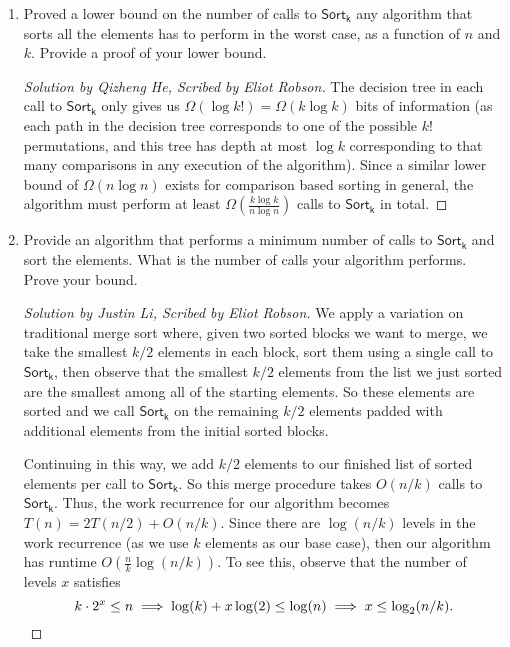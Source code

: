\documentclass{article}
\newenvironment{scribed}[2]{\begin{proof}[Solution by #1, Scribed by #2]}{\end{proof}}
\newcommand{\Sortk}{\mathsf{Sort_k}}
\begin{document}
\begin{enumerate}
	\item Proved a lower bound on the number of calls to \(\Sortk\) any algorithm that sorts all the elements has to perform in the worst case, as a function of \(n\) and \(k\). Provide a proof of your lower bound. 
	
	\begin{scribed}{Qizheng He}{Eliot Robson}
		The decision tree in each call to \(\Sortk\) only gives us \(\Omega(\log k!) = \Omega(k \log k)\) bits of information (as each path in the decision tree corresponds to one of the possible \(k!\) permutations, and this tree has depth at most \(\log k\) corresponding to that many comparisons in any execution of the algorithm). Since a similar lower bound of \(\Omega(n \log n)\) exists for comparison based sorting in general, the algorithm must perform at least \(\Omega(\frac{k \log k}{n \log n})\) calls to \(\Sortk\) in total.
	\end{scribed}
	
	\item Provide an algorithm that performs a minimum number of calls to \(\Sortk\) and sort the elements. What is the number of calls your algorithm performs. Prove your bound.
	
	\begin{scribed}{Justin Li}{Eliot Robson}
		We apply a variation on traditional merge sort where, given two sorted blocks we want to merge, we take the smallest \(k/2\) elements in each block, sort them using a single call to \(\Sortk\), then observe that the smallest \(k/2\) elements from the list we just sorted are the smallest among all of the starting elements. So these elements are sorted and we call \(\Sortk\) on the remaining \(k/2\) elements padded with additional elements from the initial sorted blocks.
        
        Continuing in this way, we add \(k/2\) elements to our finished list of sorted elements per call to \(\Sortk\). So this merge procedure takes \(O(n/k)\) calls to \(\Sortk\). Thus, the work recurrence for our algorithm becomes \(T(n) = 2 T(n/2) + O(n/k)\). Since there are \(\log (n/k)\) levels in the work recurrence (as we use \(k\) elements as our base case), then our algorithm has runtime \(O(\frac{n}{k} \log (n/k))\). To see this, observe that the number of levels \(x\) satisfies
        \[
            k \cdot 2^x \leq n
            \implies
            \log(k) + x \log(2) \leq \log(n)
            \implies
            x \leq \log_2 (n/k). \qedhere
        \]
	\end{scribed}
\end{enumerate}
\end{document}
